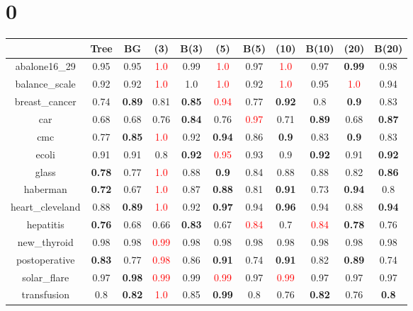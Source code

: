 \documentclass{article}%
\begin{document}
%
\normalsize%
\section*{0}%
\begin{tabular}{c|cccccccccc}%
\hline%
&Tree&BG&(3)&B(3)&(5)&B(5)&(10)&B(10)&(20)&B(20)\\%
\hline%
abalone16\_29&0.95&0.95&\textcolor{red}{ 
1.0
}&0.99&\textcolor{red}{ 
1.0
}&0.97&\textcolor{red}{ 
1.0
}&0.97&\textbf{0.99}&0.98\\%
\hline%
balance\_scale&0.92&0.92&\textcolor{red}{ 
1.0
}&1.0&\textcolor{red}{ 
1.0
}&0.92&\textcolor{red}{ 
1.0
}&0.95&\textcolor{red}{ 
1.0
}&0.94\\%
\hline%
breast\_cancer&0.74&\textbf{0.89}&0.81&\textbf{0.85}&\textcolor{red}{ 
0.94
}&0.77&\textbf{0.92}&0.8&\textbf{0.9}&0.83\\%
\hline%
car&0.68&0.68&0.76&\textbf{0.84}&0.76&\textcolor{red}{ 
0.97
}&0.71&\textbf{0.89}&0.68&\textbf{0.87}\\%
\hline%
cmc&0.77&\textbf{0.85}&\textcolor{red}{ 
1.0
}&0.92&\textbf{0.94}&0.86&\textbf{0.9}&0.83&\textbf{0.9}&0.83\\%
\hline%
ecoli&0.91&0.91&0.8&\textbf{0.92}&\textcolor{red}{ 
0.95
}&0.93&0.9&\textbf{0.92}&0.91&\textbf{0.92}\\%
\hline%
glass&\textbf{0.78}&0.77&\textcolor{red}{ 
1.0
}&0.88&\textbf{0.9}&0.84&0.88&0.88&0.82&\textbf{0.86}\\%
\hline%
haberman&\textbf{0.72}&0.67&\textcolor{red}{ 
1.0
}&0.87&\textbf{0.88}&0.81&\textbf{0.91}&0.73&\textbf{0.94}&0.8\\%
\hline%
heart\_cleveland&0.88&\textbf{0.89}&\textcolor{red}{ 
1.0
}&0.92&\textbf{0.97}&0.94&\textbf{0.96}&0.94&0.88&\textbf{0.94}\\%
\hline%
hepatitis&\textbf{0.76}&0.68&0.66&\textbf{0.83}&0.67&\textcolor{red}{ 
0.84
}&0.7&\textcolor{red}{ 
0.84
}&\textbf{0.78}&0.76\\%
\hline%
new\_thyroid&0.98&0.98&\textcolor{red}{ 
0.99
}&0.98&0.98&0.98&0.98&0.98&0.98&0.98\\%
\hline%
postoperative&\textbf{0.83}&0.77&\textcolor{red}{ 
0.98
}&0.86&\textbf{0.91}&0.74&\textbf{0.91}&0.82&\textbf{0.89}&0.74\\%
\hline%
solar\_flare&0.97&\textbf{0.98}&\textcolor{red}{ 
0.99
}&0.99&\textcolor{red}{ 
0.99
}&0.97&\textcolor{red}{ 
0.99
}&0.97&0.97&0.97\\%
\hline%
transfusion&0.8&\textbf{0.82}&\textcolor{red}{ 
1.0
}&0.85&\textbf{0.99}&0.8&0.76&\textbf{0.82}&0.76&\textbf{0.8}\\%

\end{tabular}
\end{document}
